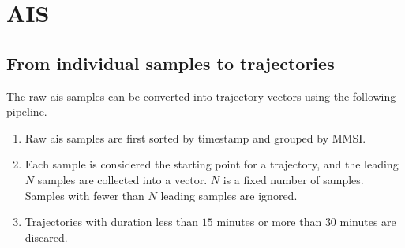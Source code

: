 \chapter{AIS}

\section{From individual samples to trajectories}\label{sec:from_ais_to_traj}
The raw \acrshort{ais} samples can be converted into trajectory vectors using the following pipeline.
\begin{enumerate}
    \item Raw \acrshort{ais} samples are first sorted by timestamp and grouped by MMSI.
    \item Each sample is considered the starting point for a trajectory, and the leading $N$ samples are collected into a vector. $N$ is a fixed number of samples. Samples with fewer than $N$ leading samples are ignored.
    \item Trajectories with duration less than $15$ minutes or more than $30$ minutes are discared. 
\end{enumerate}